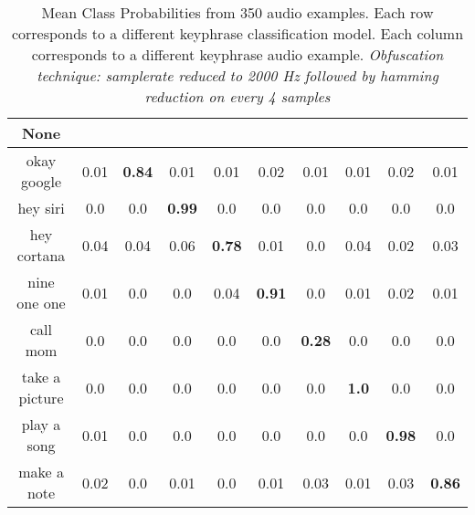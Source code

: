 \begin{table}[!th]
\begin{tabular}{cccccccccc}%
\hline%
None&\rotate{random talk}{70}&\rotate{okay google}{70}&\rotate{hey siri}{70}&\rotate{hey cortana}{70}&\rotate{nine one one}{70}&\rotate{call mom}{70}&\rotate{take a picture}{70}&\rotate{play a song}{70}&\rotate{make a note}{70}\\%
\hline%
okay google&0.01&\textbf{0.84}&0.01&0.01&0.02&0.01&0.01&0.02&0.01\\%
hey siri&0.0&0.0&\textbf{0.99}&0.0&0.0&0.0&0.0&0.0&0.0\\%
hey cortana&0.04&0.04&0.06&\textbf{0.78}&0.01&0.0&0.04&0.02&0.03\\%
nine one one&0.01&0.0&0.0&0.04&\textbf{0.91}&0.0&0.01&0.02&0.01\\%
call mom&0.0&0.0&0.0&0.0&0.0&\textbf{0.28}&0.0&0.0&0.0\\%
take a picture&0.0&0.0&0.0&0.0&0.0&0.0&\textbf{1.0}&0.0&0.0\\%
play a song&0.01&0.0&0.0&0.0&0.0&0.0&0.0&\textbf{0.98}&0.0\\%
make a note&0.02&0.0&0.01&0.0&0.01&0.03&0.01&0.03&\textbf{0.86}\\%
\hline%
\end{tabular}
\caption{Mean Class Probabilities from 350 audio examples. Each row corresponds to a different keyphrase classification model. Each column corresponds to a different keyphrase audio example. \emph{Obfuscation technique: samplerate reduced to 2000 Hz followed by hamming reduction on every 4 samples}}
\label{tab:probs_samplerate_2000_hamming_4}
\end{table}







